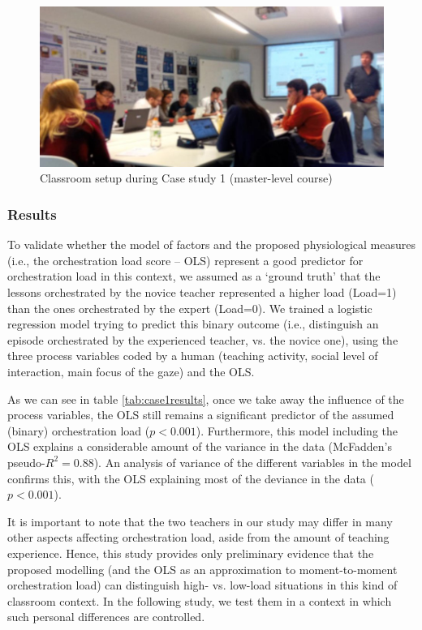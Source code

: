 \documentclass[10pt,journal,compsoc]{IEEEtran}
\begin{document}
\begin{figure}[!t]
\centering
\includegraphics[width=\linewidth]{Case1Picture}
\caption{Classroom setup during Case study 1 (master-level course)}
\label{fig:case1picture}
\end{figure}

\subsubsection{Results}

To validate whether the model of factors and the proposed physiological measures (i.e., the orchestration load score -- OLS) represent a good predictor for orchestration load in this context, we assumed as a `ground truth' that the lessons orchestrated by the novice teacher represented a higher load (Load=1) than the ones orchestrated by the expert (Load=0). We trained a logistic regression model trying to predict this binary outcome (i.e., distinguish an episode orchestrated by the experienced teacher, vs. the novice one), using the three process variables coded by a human (teaching activity, social level of interaction, main focus of the gaze) and the OLS. 

As we can see in table \ref{tab:case1results}, once we take away the influence of the process variables, the OLS still remains a significant predictor of the assumed (binary) orchestration load ($p<0.001$). Furthermore, this model including the OLS explains a considerable amount of the variance in the data (McFadden's pseudo-$R^2=0.88$). An analysis of variance of the different variables in the model confirms this, with the OLS explaining most of the deviance in the data ($p<0.001$). 

It is important to note that the two teachers in our study may differ in many other aspects affecting orchestration load, aside from the amount of teaching experience. Hence, this study provides only preliminary evidence that the proposed modelling (and the OLS as an approximation to moment-to-moment orchestration load) can distinguish high- vs. low-load situations in this kind of classroom context. In the following study, we test them in a context in which such personal differences are controlled.
\end{document}
